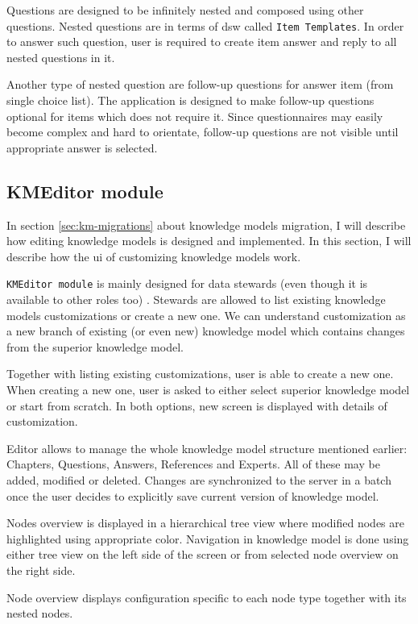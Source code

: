 Questions are designed to be infinitely nested and composed using other questions.
Nested questions are in terms of \gls{dsw} called \texttt{Item Templates}.
In order to answer such question, user is required to create item answer and reply to all nested questions in it.

Another type of nested question are follow-up questions for answer item (from single choice list).
The application is designed to make follow-up questions optional for items which does not require it.
Since questionnaires may easily become complex and hard to orientate, follow-up questions are not visible until appropriate answer is selected.

\subsection{KMEditor module}\label{sec:kmeditor-module}

In section \ref{sec:km-migrations} about knowledge models migration, I will describe how editing knowledge models is designed and implemented.
In this section, I will describe how the \gls{ui} of customizing knowledge models work.

\texttt{KMEditor module} is mainly designed for data stewards (even though it is available to other roles too) .
Stewards are allowed to list existing knowledge models customizations or create a new one.
We can understand customization as a new branch of existing (or even new) knowledge model which contains changes from the superior knowledge model.

Together with listing existing customizations, user is able to create a new one.
When creating a new one, user is asked to either select superior knowledge model or start from scratch.
In both options, new screen is displayed with details of customization.

Editor allows to manage the whole knowledge model structure mentioned earlier: Chapters, Questions, Answers, References and Experts.
All of these may be added, modified or deleted.
Changes are synchronized to the server in a batch once the user decides to explicitly save current version of knowledge model.

Nodes overview is displayed in a hierarchical tree view where modified nodes are highlighted using appropriate color.
Navigation in knowledge model is done using either tree view on the left side of the screen or from selected node overview on the right side.

Node overview displays configuration specific to each node type together with its nested nodes.

